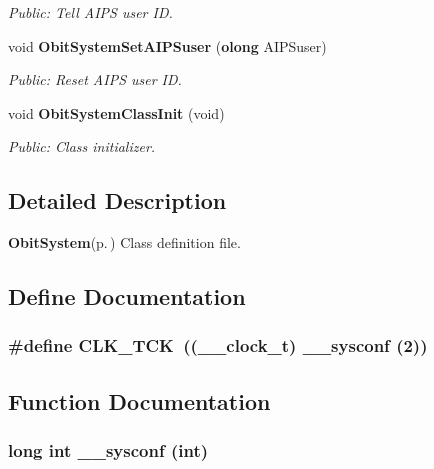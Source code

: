 \begin{CompactItemize}
\begin{CompactList}\small\item\em Public: Tell AIPS user ID. \item\end{CompactList}\item 
void {\bf Obit\-System\-Set\-AIPSuser} ({\bf olong} AIPSuser)
\begin{CompactList}\small\item\em Public: Reset AIPS user ID. \item\end{CompactList}\item 
void {\bf Obit\-System\-Class\-Init} (void)
\begin{CompactList}\small\item\em Public: Class initializer. \item\end{CompactList}\end{CompactItemize}


\subsection{Detailed Description}
{\bf Obit\-System}{\rm (p.\,\pageref{structObitSystem})} Class definition file. 



\subsection{Define Documentation}
\subsubsection{\setlength{\rightskip}{0pt plus 5cm}\#define CLK\_\-TCK\ ((\_\-\_\-clock\_\-t) \_\-\_\-sysconf (2))}\label{ObitSystem_8c_a0}




\subsection{Function Documentation}
\subsubsection{\setlength{\rightskip}{0pt plus 5cm}long int \_\-\_\-sysconf (int)}\label{ObitSystem_8c_a5}



